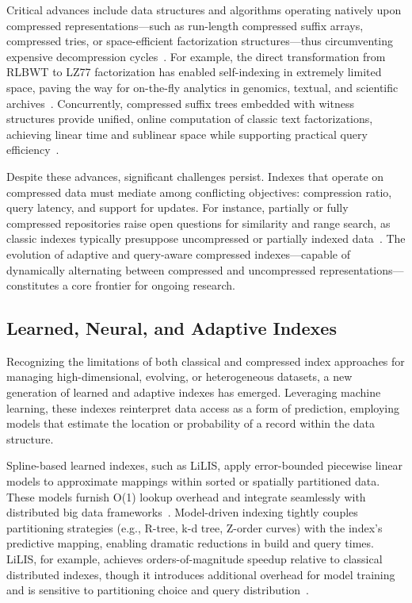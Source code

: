 \documentclass[sigconf]{acmart}
\begin{document}
Critical advances include data structures and algorithms operating natively upon compressed representations—such as run-length compressed suffix arrays, compressed tries, or space-efficient factorization structures—thus circumventing expensive decompression cycles~\cite{ref80,ref81,ref82,ref87,ref106,ref108,ref109,ref118}. For example, the direct transformation from RLBWT to LZ77 factorization has enabled self-indexing in extremely limited space, paving the way for on-the-fly analytics in genomics, textual, and scientific archives~\cite{ref108}. Concurrently, compressed suffix trees embedded with witness structures provide unified, online computation of classic text factorizations, achieving linear time and sublinear space while supporting practical query efficiency~\cite{ref109}.

Despite these advances, significant challenges persist. Indexes that operate on compressed data must mediate among conflicting objectives: compression ratio, query latency, and support for updates. For instance, partially or fully compressed repositories raise open questions for similarity and range search, as classic indexes typically presuppose uncompressed or partially indexed data~\cite{ref118}. The evolution of adaptive and query-aware compressed indexes—capable of dynamically alternating between compressed and uncompressed representations—constitutes a core frontier for ongoing research.

\subsection{Learned, Neural, and Adaptive Indexes}

Recognizing the limitations of both classical and compressed index approaches for managing high-dimensional, evolving, or heterogeneous datasets, a new generation of learned and adaptive indexes has emerged. Leveraging machine learning, these indexes reinterpret data access as a form of prediction, employing models that estimate the location or probability of a record within the data structure.

Spline-based learned indexes, such as LiLIS, apply error-bounded piecewise linear models to approximate mappings within sorted or spatially partitioned data. These models furnish O(1) lookup overhead and integrate seamlessly with distributed big data frameworks~\cite{ref110}. Model-driven indexing tightly couples partitioning strategies (e.g., R-tree, k-d tree, Z-order curves) with the index’s predictive mapping, enabling dramatic reductions in build and query times. LiLIS, for example, achieves orders-of-magnitude speedup relative to classical distributed indexes, though it introduces additional overhead for model training and is sensitive to partitioning choice and query distribution~\cite{ref110}.
\end{document}
